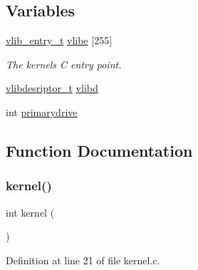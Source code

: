 \subsection*{Variables}
\begin{DoxyCompactItemize}
\item 
\hyperlink{a00194_a97c1a7136f2ab06368e93c2d7533d619_a97c1a7136f2ab06368e93c2d7533d619}{vlib\+\_\+entry\+\_\+t} \hyperlink{a00068_af69f4f709fdab28dec6b8fb75fb4d526_af69f4f709fdab28dec6b8fb75fb4d526}{vlibe} \mbox{[}255\mbox{]}
\begin{DoxyCompactList}\small\item\em The kernels C entry point. \end{DoxyCompactList}\item 
\hyperlink{a00194_a2d9000b4fbb25c5ed2950a2d8f4921d5_a2d9000b4fbb25c5ed2950a2d8f4921d5}{vlibdesriptor\+\_\+t} \hyperlink{a00068_a2125beec541d04796805161dbec05fcf_a2125beec541d04796805161dbec05fcf}{vlibd}
\item 
int \hyperlink{a00068_af37cb131d8a2101addfbf5fb2d8a53b4_af37cb131d8a2101addfbf5fb2d8a53b4}{primarydrive}
\end{DoxyCompactItemize}


\subsection{Function Documentation}
\mbox{\label{a00068_a4ee3d1f05046b7afc6b4d516bf10667a_a4ee3d1f05046b7afc6b4d516bf10667a}} 
\subsubsection{\texorpdfstring{kernel()}{kernel()}}
{\footnotesize\ttfamily int kernel (\begin{DoxyParamCaption}{ }\end{DoxyParamCaption})}



Definition at line 21 of file kernel.\+c.


